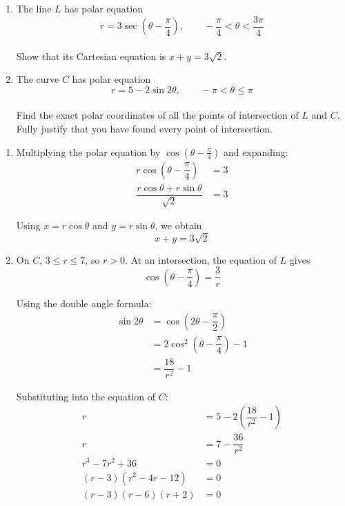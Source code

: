 \documentclass[leqno]{article}
\begin{document}
\begin{enumerate}[
  label=\textbf{\arabic*.},
  leftmargin=*,
  topsep=0pt,
  partopsep=0pt,
  parsep=0pt
]
\begin{enumerate}[label=\textbf{(\alph*)}]
\item The line $L$ has polar equation
\[
r=3\sec\left(\theta-\frac{\pi}{4}\right),\qquad -\frac{\pi}{4}<\theta<\frac{3\pi}{4}
\] \\
Show that its Cartesian equation is $x+y=3\sqrt{2}$.  \\
\item The curve $C$ has polar equation
\[
r=5-2\sin 2\theta,\qquad -\pi<\theta\leq\pi
\] \\
Find the exact polar coordinates of all the points of intersection of $L$ and $C$. \\
Fully justify that you have found every point of intersection.  \\
\end{enumerate}

\vspace*{10pt}

\begin{djsSolution}
\begin{enumerate}[label=\textbf{(\alph*)}, start=1]
\item Multiplying the polar equation by \(\cos\left(\theta-\frac{\pi}{4}\right)\) and expanding:
\begin{align*}
r\cos\left(\theta-\dfrac{\pi}{4}\right)&=3\\
\dfrac{r\cos\theta+r\sin\theta}{\sqrt{2}}&=3
\end{align*}

Using \(x=r\cos\theta\) and \(y=r\sin\theta\), we obtain
\[
x+y=3\sqrt{2}
\]

\item On \(C\), \(3\leq r\leq7\), so \(r>0\). At an intersection, the equation of \(L\) gives
\[
\cos\left(\theta-\dfrac{\pi}{4}\right)=\dfrac{3}{r}
\]

Using the double angle formula:
\begin{align*}
\sin2\theta
&=\cos\left(2\theta-\dfrac{\pi}{2}\right)\\
&=2\cos^2\left(\theta-\dfrac{\pi}{4}\right)-1\\
&=\dfrac{18}{r^2}-1
\end{align*}

Substituting into the equation of \(C\):
\begin{align*}
r&=5-2\left(\dfrac{18}{r^2}-1\right)\\
r&=7-\dfrac{36}{r^2}\\
r^3-7r^2+36&=0\\
(r-3)(r^2-4r-12)&=0\\
(r-3)(r-6)(r+2)&=0
\end{align*}


\end{enumerate}
\end{djsSolution}
\end{enumerate}
\end{document}
